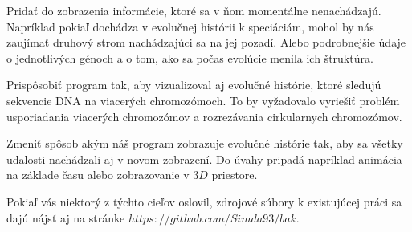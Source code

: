 Pridať do zobrazenia informácie, ktoré sa v ňom momentálne nenachádzajú. Napríklad pokiaľ dochádza v evolučnej histórii k speciáciám, 
mohol by nás zaujímať druhový strom nachádzajúci sa na jej pozadí. Alebo podrobnejšie údaje o jednotlivých génoch a o tom,
ako sa počas evolúcie menila ich štruktúra.

Prispôsobiť program tak, aby vizualizoval aj evolučné histórie, ktoré sledujú sekvencie DNA na viacerých chromozómoch. 
To by vyžadovalo vyriešiť problém usporiadania viacerých chromozómov a rozrezávania cirkularnych chromozómov.

Zmeniť spôsob akým náš program zobrazuje evolučné histórie tak, aby sa všetky udalosti nachádzali aj v novom zobrazení.
Do úvahy pripadá napríklad animácia na základe času alebo zobrazovanie v $3D$ priestore.

Pokiaľ vás niektorý z týchto cieľov oslovil, zdrojové súbory k existujúcej práci sa dajú nájsť aj na stránke $https://github.com/Simda93/bak$.
